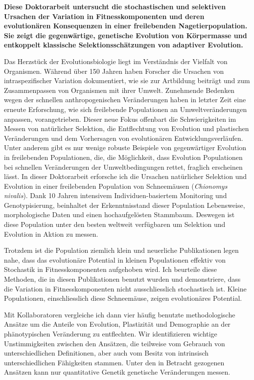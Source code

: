 \begin{zusammenfassung}
\textbf{Diese Doktorarbeit untersucht die stochastischen und selektiven Ursachen der Variation in Fitnesskomponenten und deren evolution{\"a}ren Konsequenzen in einer freilebenden Nagetierpopulation. Sie zeigt die gegenw{\"a}rtige, genetische Evolution von K{\"o}rpermasse und entkoppelt klassische Selektionssch{\"a}tzungen von adaptiver Evolution.}

Das Herzst{\"u}ck der Evolutionsbiologie liegt im Verst{\"a}ndnis der Vielfalt von Organismen. W{\"a}hrend {\"u}ber 150 Jahren haben Forscher die Ursachen von intraspezifischer Variation dokumentiert, wie sie zur Artbildung beitr{\"a}gt und zum Zusammenpassen von Organismen mit ihrer Umwelt. Zunehmende Bedenken wegen der schnellen anthropogenischen Ver{\"a}nderungen haben in letzter Zeit eine erneute Erforschung, wie sich freilebende Populationen an Umweltver{\"a}nderungen anpassen, vorangetrieben. Dieser neue Fokus offenbart die Schwierigkeiten im Messen von nat{\"u}rlicher Selektion, die Entflechtung von Evolution und plastischen Ver{\"a}nderungen und dem Vorhersagen von evolution{\"a}ren Entwicklungsverl{\"a}ufen. Unter anderem gibt es nur wenige robuste Beispiele von gegenw{\"a}rtiger Evolution in freilebenden Populationen, die, die M{\"o}glichkeit, dass Evolution Populationen bei schnellen Ver{\"a}nderungen der Umweltbedingungen rettet, fraglich erscheinen l{\"a}sst. In dieser Doktorarbeit erforsche ich die Ursachen nat{\"u}rlicher Selektion und Evolution in einer freilebenden Population von Schneem{\"a}usen (\textit{Chionomys nivalis}). Dank 10 Jahren intensivem Individuen-basiertem Monitoring und Genotypisierung, beinhaltet der Erkenntnisstand dieser Population Lebensweise, morphologische Daten und einen hochaufgel{\"o}sten Stammbaum. Deswegen ist diese Population unter den besten weltweit verf{\"u}gbaren um Selektion und Evolution in Aktion zu messen. 

Trotzdem ist die Population ziemlich klein und neuerliche Publikationen legen nahe, dass das evolution{\"a}re Potential in kleinen Populationen effektiv von Stochastik in Fitnesskomponenten aufgehoben wird. Ich beurteile diese Methoden, die in diesen Publikationen benutzt wurden und demonstriere, dass die Variation in Fitnesskomponenten nicht ausschliesslich stochastisch ist. Kleine Populationen, einschliesslich diese Schneem{\"a}use, zeigen evolution{\"a}res Potential. 

Mit Kollaboratoren vergleiche ich dann vier h{\"a}ufig benutzte methodologische Ans{\"a}tze um die Anteile von Evolution, Plastizit{\"a}t und Demographie an der ph{\"a}notypischen Ver{\"a}nderung zu entflechten. Wir identifizieren wichtige Unstimmigkeiten zwischen den Ans{\"a}tzen, die teilweise vom Gebrauch von unterschiedlichen Definitionen, aber auch vom Besitz von intrinsisch unterschiedlichen F{\"a}higkeiten stammen. Unter den in Betracht gezogenen Ans{\"a}tzen kann nur quantitative Genetik genetische Ver{\"a}nderungen messen. 


\end{zusammenfassung}
